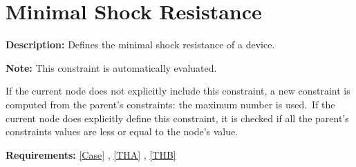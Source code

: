 \section{Minimal Shock Resistance}\label{CONSTRAINTMinShockResistance}
\textbf{Description:} Defines the minimal shock resistance of a device.

\textbf{Note:} This constraint is automatically evaluated.\par If the current node does not explicitly include this constraint, a new constraint is computed from the parent's constraints: the maximum number is used.\ If the current node does explicitly define this constraint, it is checked if all the parent's constraints values are less or equal to the node's value.

\textbf{Requirements:} \ref{Case} , \ref{THA} , \ref{THB} 
